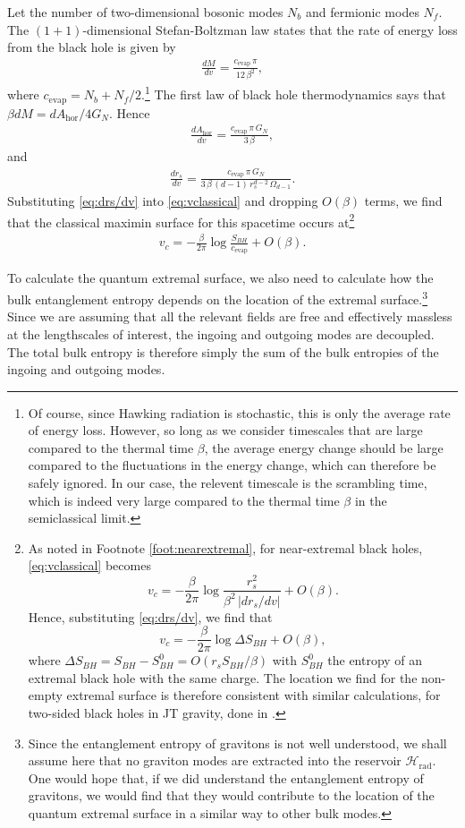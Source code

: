\documentclass[11pt,a4paper]{article}
\begin{document}
Let the number of two-dimensional bosonic modes $N_b$ and fermionic modes $N_f$. The $(1+1)$-dimensional Stefan-Boltzman law \cite{landsberg1989stefan} states that the rate of energy loss from the black hole is given by
\begin{align} \label{eq:energyflux}
\frac{d M}{d v} =  \frac{c_\text{evap}\, \pi}{12 \,\beta^2},
\end{align}
where $c_\text{evap} = N_b + N_f/2$.\footnote{Of course, since Hawking radiation is stochastic, this is only the average rate of energy loss. However, so long as we consider timescales that are large compared to the thermal time $\beta$, the average energy change should be large compared to the fluctuations in the energy change, which can therefore be safely ignored. In our case, the relevent timescale is the scrambling time, which is indeed very large compared to the thermal time $\beta$ in the semiclassical limit.} The first law of black hole thermodynamics says that $\beta dM = dA_\text{hor}/4G_N$. Hence
\begin{align} \label{eq:dAhor/dv}
\frac{d A_\text{hor}}{d v} = \frac{c_\text{evap}\, \pi \,G_N}{3\, \beta},
\end{align}
and
\begin{align} \label{eq:drs/dv}
\frac{d r_s}{d v} = \frac{c_\text{evap} \,\pi\, G_N}{3 \,\beta \,(d-1)\, r_s^{d-2}\, \Omega_{d-1}}.
\end{align}
Substituting \eqref{eq:drs/dv} into \eqref{eq:vclassical} and dropping $O(\beta)$ terms,  we find that the classical maximin surface for this spacetime occurs at\footnote{As noted in Footnote \ref{foot:nearextremal}, for near-extremal black holes, \eqref{eq:vclassical} becomes $$v_c = - \frac{\beta}{2\pi} \log \frac{r_s^2}{\beta^2\, |d r_s/d v|} + O(\beta).$$ Hence, substituting \eqref{eq:drs/dv}, we find that $$v_c = - \frac{\beta}{2\pi} \log \Delta S_{BH} + O(\beta),$$ where $\Delta S_{BH} = S_{BH} - S_{BH}^0 =  O(r_s S_{BH} / \beta)$ with $S_{BH}^0$ the entropy of an extremal black hole with the same charge. The location we find for the non-empty extremal surface is therefore consistent with similar calculations, for two-sided black holes in JT gravity, done in \cite{almheiri2019entropy}.}
\begin{align} \label{eq:vc}
v_c = -\frac{\beta}{2 \pi} \log \frac{S_{BH}}{c_\text{evap}} + O(\beta).
\end{align}

To calculate the quantum extremal surface, we also need to calculate how the bulk entanglement entropy depends on the location of the extremal surface.\footnote{Since the entanglement entropy of gravitons is not well understood, we shall assume here that no graviton modes are extracted into the reservoir $\mathcal{H}_\text{rad}$. One would hope that, if we did understand the entanglement entropy of gravitons, we would find that they would contribute to the location of the quantum extremal surface in a similar way to other bulk modes.} Since we are assuming that all the relevant fields are free and effectively massless at the lengthscales of interest, the ingoing and outgoing modes are decoupled. The total bulk entropy is therefore simply the sum of the bulk entropies of the ingoing and outgoing modes.
\end{document}
